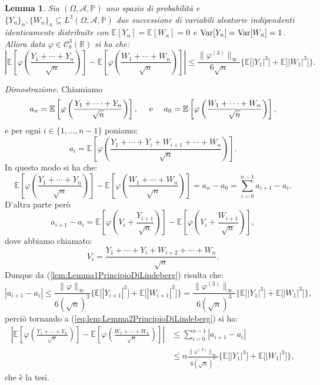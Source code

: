 \documentclass[11pt]{book}
\makeatletter
\theoremstyle{Definizione}
\theoremstyle{TeoremaProposizioneLemmaCorollario}
\newtheorem{mylem}[myteo]{Lemma}
\theoremstyle{OsservazioneNota}
\renewenvironment{proof}[1][\proofname]{\par
  \normalfont \topsep6\p@\@plus6\p@\relax
  \trivlist
  \item[\hskip\labelsep
        \itshape
    #1\@addpunct{.}]\ignorespaces
}{%
  \endtrivlist\@endpefalse
}
\newcommand{\R}{\mathbb{R}}
\renewcommand{\P}{\mathbb{P}}
\newcommand{\E}{\mathbb{E}}
\newcommand{\Var}{\textup{Var}}
\renewenvironment{proof}{\textsl{Dimostrazione}.}{}
\makeatother
\begin{document}
\begin{boxoss}
\begin{mylem}\label{lem:Lemma2PrincipioDiLindeberg}
Sia $(\Omega,\mathcal{A},\P)$ uno spazio di probabilità e $\{Y_n\}_n,\{W_n\}_n\subseteq L^3(\Omega,\mathcal{A},\P)$ due successione di variabili aleatorie indipendenti identicamente distribuite con $\E[Y_n] = \E[W_n] = 0$ e $\Var[Y_n] = \Var[W_n] = 1$. Allora data $\varphi\in \mathcal{C}_b^3(\R)$ si ha che:
$$
\left|\E\left[\varphi\left(\frac{Y_1+\cdots+Y_n}{\sqrt{n}}\right)\right]-\E\left[\varphi\left(\frac{W_1+\cdots+W_n}{\sqrt{n}}\right)\right]\right| \leq \frac{\|\varphi^{(3)}\|_\infty}{6 \sqrt{n}}\Big\{\E\big[|Y_1|^3\big]+\E\big[|W_1|^3\big]\Big\}.
$$
\end{mylem}
\tcblower
\begin{proof}
Chiamiamo
$$
a_n = \E\left[\varphi\left(\frac{Y_1+\cdots+Y_n}{\sqrt{n}}\right)\right],\quad \textup{ e }\quad a_0 = \E\left[\varphi\left(\frac{W_1+\cdots+W_n}{\sqrt{n}}\right)\right],
$$
e per ogni $i\in \{1,\dots,n-1\}$ poniamo:
$$
a_i = \E\left[\varphi\left(\frac{Y_1+\cdots+Y_i+W_{i+1}+\cdots+W_n}{\sqrt{n}}\right)\right].
$$
In questo modo si ha che:
\begin{equation}\label{eq:lem:Lemma2PrincipioDiLindeberg}
\E\left[\varphi\left(\frac{Y_1+\cdots+Y_n}{\sqrt{n}}\right)\right]-\E\left[\varphi\left(\frac{W_1+\cdots+W_n}{\sqrt{n}}\right)\right] = a_n-a_0 = \sum_{i = 0}^{n-1} a_{i+1}-a_i.
\end{equation}
D'altra parte però 
$$
a_{i+1}-a_i = \E\left[\varphi\left(V_i+\frac{Y_{i+1}}{\sqrt{n}}\right)\right]-\E\left[\varphi\left(V_i+\frac{W_{i+1}}{\sqrt{n}}\right)\right],
$$
dove abbiamo chiamato:
$$
V_i = \frac{Y_1+\cdots+Y_i+W_{i+2}+\cdots+W_n}{\sqrt{n}}.
$$
Dunque da (\ref{lem:Lemma1PrincipioDiLindeberg}) risulta che:
$$
|a_{i+1}-a_i| \leq \frac{\|\varphi\|_\infty}{6(\sqrt{n})^3}\Big\{\E\big[|Y_{i+1}|^3\big]+\E\big[|W_{i+1}|^3\big]\Big\} = \frac{\|\varphi^{(3)}\|_\infty}{6(\sqrt{n})^3}\Big\{\E\big[|Y_{1}|^3\big]+\E\big[|W_{1}|^3\big]\Big\},
$$
perciò tornando a (\ref{eq:lem:Lemma2PrincipioDiLindeberg}) si ha:
\begin{align*}
\left|\E\left[\varphi\left(\frac{Y_1+\cdots+Y_n}{\sqrt{n}}\right)\right]-\E\left[\varphi\left(\frac{W_1+\cdots+W_n}{\sqrt{n}}\right)\right]\right| &\leq \sum_{i = 0}^{n-1} |a_{i+1}-a_i| \\
&\leq n \frac{\|\varphi^{(3)}\|_\infty}{6(\sqrt{n})^3}\Big\{\E\big[|Y_{1}|^3\big]+\E\big[|W_{1}|^3\big]\Big\},
\end{align*}
che è la tesi.
\end{proof}
\end{boxoss}
\end{document}
